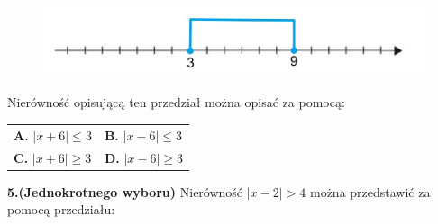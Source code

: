 \documentclass[12pt,a4paper]{article}
\theoremstyle{break}
\begin{document}
\begin{figure}[h]
	\centering
	\includegraphics[scale=0.5]{z1_1.jpeg}
\end{figure}

Nierówność opisującą ten przedział można opisać za pomocą:

\vspace{0.5cm}
\begin{tabular}{p{5cm} p{5cm}}
	\textbf{A. }$|x+6|\leq3$&
	\textbf{B. }$|x-6|\leq3$\\
	\textbf{C. }$|x+6|\geq3$&
	\textbf{D. }$|x-6|\geq3$\\
\end{tabular}

\begin{mdframed}[style=zad]
	\vspace{0.2cm}
	\textbf{5.}$  $\textbf{(Jednokrotnego wyboru)} Nierówność $|x-2|>4$ można przedstawić za pomocą przedziału:
\end{mdframed}
\end{document}
